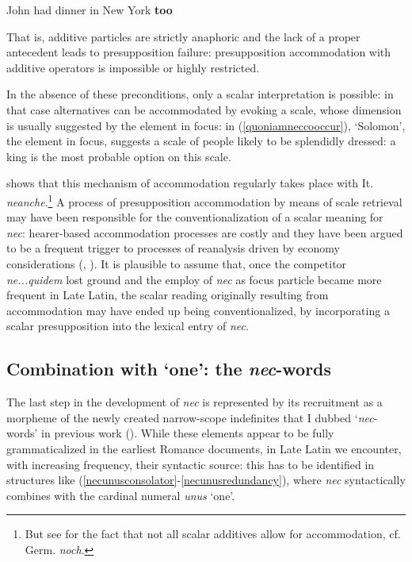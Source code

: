 \documentclass[output=paper,modfonts,nonflat,citecolor=brown,
showindex
]{langsci/langscibook}
\begin{document}
{\begin{exe}
\ex {}  John had dinner in New York {\textbf{too}}
\end{exe}}

\noindent That is, additive particles are strictly anaphoric and the lack of a proper antecedent leads to presupposition failure: presupposition accommodation with additive operators is impossible or highly restricted. 

In the absence of these preconditions, only a scalar interpretation is possible: in that case alternatives can be accommodated by evoking a scale, whose dimension is usually suggested by the element in focus: in (\ref{quoniamneccooccur}), `Solomon', the element in focus, suggests a scale of people likely to be splendidly dressed: a king is the most probable option on this scale. 

\citet{Tovena06} shows that this mechanism of accommodation regularly takes place with It. {\emph{neanche}}.{\footnote{But see \citet{Umbach12} for the fact that not all scalar additives allow for accommodation, cf. Germ. {\emph{noch}}.}} A process of presupposition accommodation by means of scale retrieval may have been responsible for the conventionalization of a scalar meaning for {\emph{nec}}: hearer-based accommodation processes are costly and they have been argued to be a frequent trigger to processes of reanalysis driven by economy considerations (\citealt[]{TraugottDasher02, Eckardt06}, \citealt[]{SchwenterWaltereit10}). It is plausible to assume that, once the competitor {\emph{ne...quidem}} lost ground and the employ of {\emph{nec}} as focus particle became more frequent in Late Latin, the scalar reading originally resulting from accommodation may have ended up being conventionalized, by incorporating a scalar presupposition into the lexical entry of {\emph{nec}}.
                                                     
\subsection{Combination with `one': the {\emph{nec}}-words} \label{necwordssection}

The last step in the development of {\emph{nec}} is represented by its recruitment as a morpheme of the newly created narrow-scope indefinites that I dubbed `{\emph{nec}}-words' in previous work (\citealt[chapter 5]{Gianollo18}). While these elements appear to be fully grammaticalized in the earliest Romance documents, in Late Latin we encounter, with increasing frequency, their syntactic source: this has to be identified in structures like (\ref{necunusconsolator}-\ref{necunusredundancy}), where {\emph{nec}} syntactically combines with the cardinal numeral {\emph{unus}} `one'.
\end{document}
